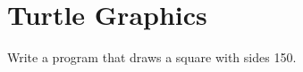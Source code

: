 \documentclass[11pt,a4paper]{report}
\begin{document}
\section{Turtle Graphics}

\begin{ex}
Write a program that draws a square with sides 150.
\end{ex}
\end{document}
